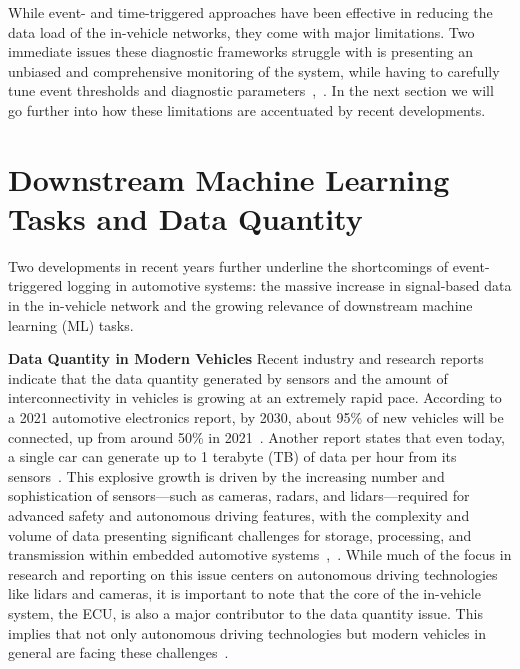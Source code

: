 While event- and time-triggered approaches have been effective in reducing the data load of the in-vehicle networks, they come with major limitations. Two immediate issues these diagnostic frameworks struggle with is presenting an unbiased and comprehensive monitoring of the system, while having to carefully tune event thresholds and diagnostic parameters~\cite[pp.~4-5--4-6]{Navet2009},~\cite{EventDrivenDiagPatent}. In the next section we will go further into how these limitations are accentuated by recent developments. 

\section{Downstream Machine Learning Tasks and Data Quantity}\label{sec:downstream-ml-and-dq} 

Two developments in recent years further underline the shortcomings of event-triggered logging in automotive systems: the massive increase in signal-based data in the in-vehicle network and the growing relevance of downstream machine learning (ML) tasks. 

\textbf{Data Quantity in Modern Vehicles} Recent industry and research reports indicate that the data quantity generated by sensors and the amount of interconnectivity in vehicles is growing at an extremely rapid pace. According to a 2021 automotive electronics report, by 2030, about 95\% of new vehicles will be connected, up from around 50\% in 2021~\cite{Bertoncello2021}. Another report states that even today, a single car can generate up to 1 terabyte (TB) of data per hour from its sensors~\cite{Samantaray2023}. This explosive growth is driven by the increasing number and sophistication of sensors—such as cameras, radars, and lidars—required for advanced safety and autonomous driving features, with the complexity and volume of data presenting significant challenges for storage, processing, and transmission within embedded automotive systems~\cite{Samantaray2023},~\cite[pp.~3--5]{Komorkiewicz2023}. While much of the focus in research and reporting on this issue centers on autonomous driving technologies like lidars and cameras, it is important to note that the core of the in-vehicle system, the ECU, is also a major contributor to the data quantity issue. This implies that not only autonomous driving technologies but modern vehicles in general are facing these challenges~\cite[pp.~3--4]{Komorkiewicz2023}.


